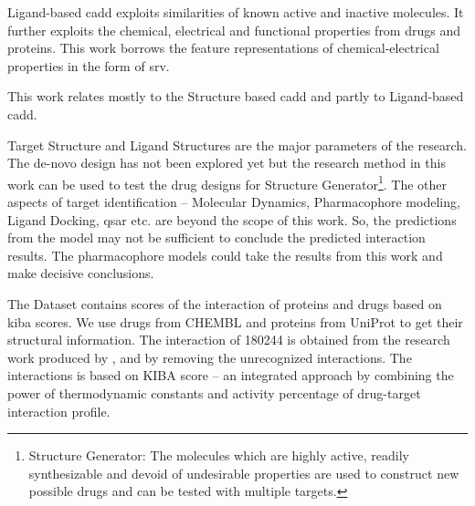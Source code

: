 
Ligand-based \acrshort{cadd} exploits similarities of known active and inactive molecules. It further exploits the chemical, electrical and functional properties from drugs and proteins. This work borrows the feature representations of chemical-electrical properties in the form of \acrfull{srv}.


This work relates mostly to the Structure based \acrshort{cadd} and partly to Ligand-based \acrshort{cadd}. 
\iffalse
The parameters of our work can be associated with \begin{itemize}
    \setlength\parindent{24pt}
    \item Target Structure %
    \item Ligand Structure %
\end{itemize}
\fi
Target Structure and Ligand Structures are the major parameters of the research. The de-novo design has not been explored yet but the research method in this work can be used to test the drug designs for Structure Generator\footnote{Structure Generator: The molecules which are highly active, readily synthesizable and devoid of undesirable properties are used to construct new possible drugs and can be tested with multiple targets.}. The other aspects of target identification -- Molecular Dynamics, Pharmacophore modeling, Ligand Docking, \acrfull{qsar} etc. are beyond the scope of this work. So, the predictions from the model may not be sufficient to conclude the predicted interaction results. The pharmacophore models could take the results from this work and make decisive conclusions. 

\iffalse
(52498, 254)
180244
\fi
The Dataset contains scores of the interaction of proteins and drugs based on \acrshort{kiba} scores. We use  drugs from CHEMBL and  proteins from UniProt to get their structural information. The interaction of 180244 is obtained from the research work produced by \cite{Tang2013}, and by removing the unrecognized interactions. The interactions is based on KIBA score -- an integrated approach by combining the power of thermodynamic constants and activity percentage of drug-target interaction profile.

